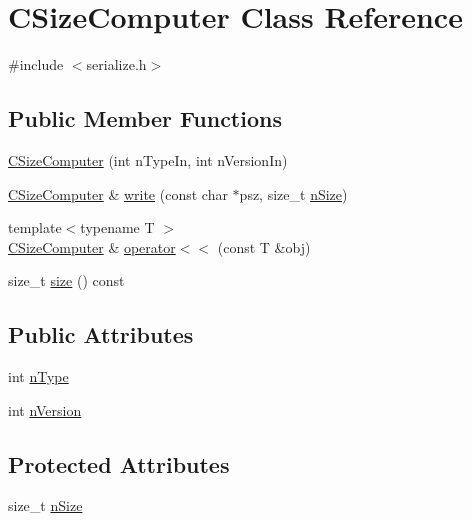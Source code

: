 \hypertarget{class_c_size_computer}{}\section{C\+Size\+Computer Class Reference}
\label{class_c_size_computer}


{\ttfamily \#include $<$serialize.\+h$>$}

\subsection*{Public Member Functions}
\begin{DoxyCompactItemize}
\item 
\hyperlink{class_c_size_computer_a475a1a15be285c38c4b94ad0ab0ce73c}{C\+Size\+Computer} (int n\+Type\+In, int n\+Version\+In)
\item 
\hyperlink{class_c_size_computer}{C\+Size\+Computer} \& \hyperlink{class_c_size_computer_ad4b4f5e37acacf894f60c728e694ee89}{write} (const char $\ast$psz, size\+\_\+t \hyperlink{class_c_size_computer_a3ea758bb100dd9ce38071e040cd3c597}{n\+Size})
\item 
{\footnotesize template$<$typename T $>$ }\\\hyperlink{class_c_size_computer}{C\+Size\+Computer} \& \hyperlink{class_c_size_computer_a03a29c76f82dca1559e7922b35bebd0d}{operator$<$$<$} (const T \&obj)
\item 
size\+\_\+t \hyperlink{class_c_size_computer_afe9389c4e6ed520192cca477d99ca483}{size} () const 
\end{DoxyCompactItemize}
\subsection*{Public Attributes}
\begin{DoxyCompactItemize}
\item 
int \hyperlink{class_c_size_computer_a1f166e95dc06a6f3718b2fac9cda18ee}{n\+Type}
\item 
int \hyperlink{class_c_size_computer_a25759db1089e475fcba2f408633dc7bf}{n\+Version}
\end{DoxyCompactItemize}
\subsection*{Protected Attributes}
\begin{DoxyCompactItemize}
\item 
size\+\_\+t \hyperlink{class_c_size_computer_a3ea758bb100dd9ce38071e040cd3c597}{n\+Size}
\end{DoxyCompactItemize}


